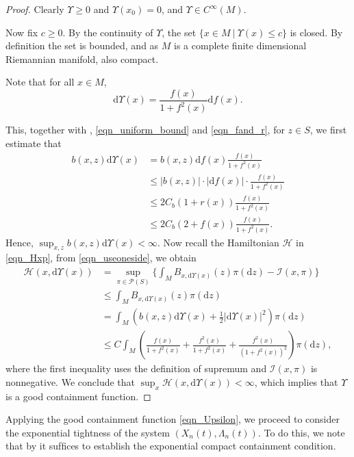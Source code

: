\documentclass[a4paper]{article}
\newcommand{\dd}{ \mathrm{d}}
\numberwithin{equation}{section}
\theoremstyle{definition}
\begin{document}
\begin{proof}
    Clearly $\Upsilon\geq 0$ and $\Upsilon(x_0)=0$, and $\Upsilon\in C^\infty(M)$.

    Now fix $c\geq 0$. By the continuity of $\Upsilon$, the set $\{x\in M~|~\Upsilon(x)\leq c\}$ is closed. By definition the set is bounded, and as $M$ is a complete finite dimensional Riemannian manifold, also compact.

    Note that for all $x\in M$,
    \begin{equation}\label{eqn_dUps}
\text{d}\Upsilon(x)=\frac{f(x)}{1+f^2(x)}\mathrm{d}f(x).
    \end{equation}

   This, together with  , \eqref{eqn_uniform_bound} and \eqref{eqn_fand_r}, for $z\in S$, we first estimate that
\begin{equation}\label{eqn_useoneside}
 \begin{split}
   b(x,z)  \mathrm{d}\Upsilon(x)&=b(x,z) \mathrm{d}f(x)\frac{f(x)}{1+f^2(x)} \\
    &\leq |b(x,z)| \cdot |\mathrm{d}f(x)|\cdot\frac{f(x)}{1+f^2(x)} \\&\leq 2C_b(1+r(x))\frac{f(x)}{1+f^2(x)} \\
    &\leq 2C_b(2+f(x))\frac{f(x)}{1+f^2(x)}.
 \end{split}
 \end{equation}
 Hence, $\sup_{x,z}b(x,z)\dd \Upsilon(x)<\infty$.
    Now recall the Hamiltonian $\mathcal{H}$ in \eqref{eqn_Hxp}, from \eqref{eqn_useoneside}, we obtain
\begin{align*}
    \mathcal{H}(x,\mathrm{d}\Upsilon(x))&=\sup_{\pi\in\mathcal{P}(S)}\big\{\int_M B_{x,\mathrm{d}\Upsilon(x)}(z)\pi(\text{d}z)-\mathcal{I}(x,\pi)\big\}\\
    &\leq \int_M B_{x,\mathrm{d}\Upsilon(x)}(z)\pi(\text{d}z)\\
     &=\int_M \left( b(x,z)\mathrm{d}\Upsilon(x)+\frac{1}{2}| \mathrm{d}\Upsilon(x)|^2\right)\pi(\mathrm{d}z)\\
     &\leq C\int_M \left(\frac{f(x)}{1+f^2(x)}+\frac{f^2(x)}{1+f^2(x)}+\frac{f^2(x)}{(1+f^2(x))^2}\right)\pi(\mathrm{d}z),
\end{align*}
where the first inequality uses the definition of supremum and $\mathcal{I}(x,\pi)$ is nonnegative.
We conclude that $\sup_x \mathcal{H}(x,\mathrm{d}\Upsilon(x))<\infty$, which implies that $\Upsilon$ is a good containment function.
\end{proof}
Applying the good containment function \eqref{eqn_Upsilon}, we proceed to consider the exponential tightness of the system $(X_n(t),\Lambda_n(t))$. To do this, we note that by \cite[Corollary 4.19]{FK2006} it sufﬁces to establish the exponential compact containment condition.
\end{document}
